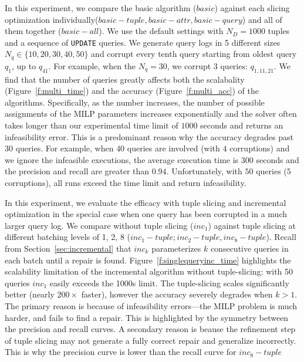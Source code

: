 In this experiment, we compare the basic algorithm ($basic$) against 
each slicing optimization individually($basic-tuple, basic-attr, basic-query$) and all of them together ($basic-all$).  
We use the default settings with $N_D = 1000$ tuples and a sequence of \texttt{UPDATE} queries.
We generate query logs in 5 different sizes $N_q\in \{10, 20, 30, 40, 50\}$ and corrupt 
every tenth query starting from oldest query $q_1$,
up to $q_{41}$.  For example, when the $N_q = {30}$, we corrupt 3 queries: $q_{1,11,21}$. 
We find that the number of queries greatly affects both the scalabality (Figure~\ref{f:multi_time}) 
and the accuracy (Figure~\ref{f:multi_acc}) of the algorithms. Specifically, as the number increases,
the number of possible assignments of the MILP parameters increases exponentially and the solver often takes
longer than our experimental time limit of $1000$ seconds and returns an infeasibility error.  
This is a predominant reason why the accuracy degrades past $30$ queries.  For example, 
when $40$ queries are involved (with $4$ corruptions) 
and we ignore the infeasible executions, the average execution time is $300$ seconds
and the precision and recall are greater than $0.94$.  Unfortunately, with $50$ queries ($5$ corruptions),
all runs exceed the time limit and return infeasibility.

In this experiment, we evaluate the efficacy \sys with tuple slicing and incremental optimization
in the special case when one query has been corrupted in a much larger query log. 
We compare \incremental without tuple slicing ($inc_1$) against tuple slicing at 
different batching levels of 1, 2, 8 ($inc_1-tuple; inc_2-tuple, inc_8-tuple$). 
Recall from Section~\ref{sec:incremental} that $inc_k$ parameterizes $k$ consecutive queries in each batch until a repair is found.
Figure~\ref{f:singlequeryinc_time} highlights the scalability limitation of the incremental 
algorithm without tuple-slicing: with 50 queries $inc_1$  easily exceeds the 1000s limit.   
The tuple-slicing scales significantly better (nearly $200\times$ faster), however
the accuracy severely degrades when $k>1$.  
The primary reason is because of infeasibility errors---the MILP problem is much harder, and fails to find a repair.  
This is highlighted by the symmetry between the precision and recall curves.  
A secondary reason is beause the refinement step of  tuple slicing may not generate a fully correct repair and generalize incorrectly.
This is why the precision curve is lower than the recall curve for $inc_8-tuple$




